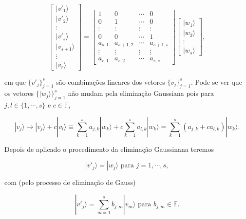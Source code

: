 \documentclass[11pt]{article}
\begin{document}
\begin{equation}
\begin{bmatrix} |v'_{1}\rangle \\ |v'_{2}\rangle \\ \vdots \\ |v'_{s}\rangle \\ |v_{s+1}\rangle \\ \vdots \\ |v_{r}\rangle \end{bmatrix}
=\begin{bmatrix} 1 & 0 & \cdots & 0 \\  0 & 1 & \cdots & 0 \\  \vdots & \vdots & \vdots & \vdots \\ 0 & 0 & \cdots & 1 \\ a_{s,1} & a_{s+1,2} & \cdots & a_{s+1,s} \\  \vdots & \vdots & \vdots & \vdots  \\ a_{r,1} & a_{r,2} & \cdots & a_{r,s} \end{bmatrix}\begin{bmatrix} |w_{1}\rangle \\ |w_{2}\rangle \\ \vdots \\ |w_{s}\rangle \end{bmatrix},
\end{equation}

em que \(\{v'_{j}\}_{j=1}^{s}\) são combinações lineares dos vetores
\(\{v_{j}\}_{j=1}^{s}\). Pode-se ver que os vetores
\(\{|w_{j}\rangle\}_{j=1}^{s}\) não mudam pela eliminação Gaussiana pois
para \(j,l\in\{1,\cdots,s\}\) e \(c\in\mathbb{F}\),

\begin{equation}
|v_{j}\rangle\rightarrow|v_{j}\rangle+c|v_{l}\rangle \equiv \sum_{k=1}^{s}a_{j,k}|w_{k}\rangle +c  \sum_{k=1}^{s}a_{l,k}|w_{k}\rangle=\sum_{k=1}^{s}(a_{j,k}+ca_{l,k})|w_{k}\rangle. 
\end{equation}

Depois de aplicado o procedimento da eliminação Gaussinana teremos

\begin{equation}
|v'_{j}\rangle=|w_{j}\rangle\text{ para } j=1,\cdots,s,
\end{equation}

com (pelo processo de eliminação de Gauss)

\begin{equation}
|v'_{j}\rangle=\sum_{m=1}^{s}b_{j,m}|v_{m}\rangle\text{ para } b_{j,m}\in\mathbb{F}.
\end{equation}
\end{document}
